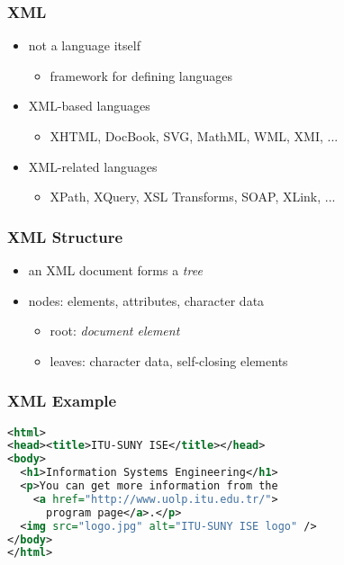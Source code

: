 \documentclass[dvipsnames]{beamer}
\theoremstyle{plain}
\begin{document}
\begin{frame}
  \frametitle{XML}

  \begin{itemize}
    \item not a language itself
    \begin{itemize}
      \item framework for defining languages
    \end{itemize}

    \pause
    \item XML-based languages
    \begin{itemize}
      \item XHTML, DocBook, SVG, MathML, WML, XMI, ...
    \end{itemize}

    \pause
    \item XML-related languages
    \begin{itemize}
      \item XPath, XQuery, XSL Transforms, SOAP, XLink, ...
    \end{itemize}
  \end{itemize}
\end{frame}

\begin{frame}
  \frametitle{XML Structure}

  \begin{itemize}
    \item an XML document forms a \emph{tree}

    \item nodes: elements, attributes, character data
    \begin{itemize}
      \item root: \emph{document element}
      \item leaves: character data, self-closing elements
    \end{itemize}
  \end{itemize}
\end{frame}

\begin{frame}[fragile]
  \frametitle{XML Example}

  \begin{example}[XHTML]
    \begin{lstlisting}[language=XML]
<html>
<head><title>ITU-SUNY ISE</title></head>
<body>
  <h1>Information Systems Engineering</h1>
  <p>You can get more information from the
    <a href="http://www.uolp.itu.edu.tr/">
      program page</a>.</p>
  <img src="logo.jpg" alt="ITU-SUNY ISE logo" />
</body>
</html>
    \end{lstlisting}
  \end{example}
\end{frame}
\end{document}
